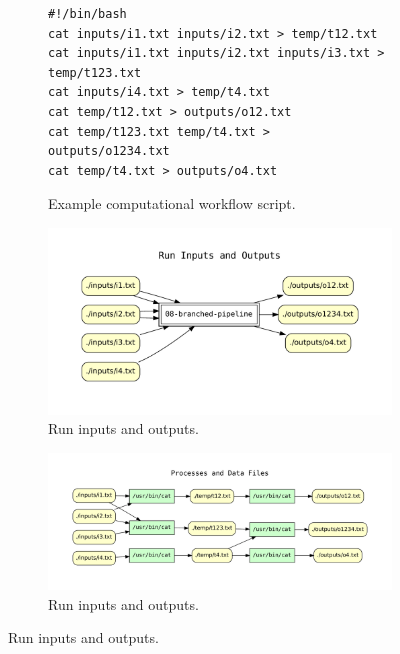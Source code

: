 \begin{figure}[h!]
    \centering
    
    \begin{subfigure}[b]{1.0\linewidth}
        \centering
        \begin{lstlisting}
#!/bin/bash
cat inputs/i1.txt inputs/i2.txt > temp/t12.txt
cat inputs/i1.txt inputs/i2.txt inputs/i3.txt > temp/t123.txt
cat inputs/i4.txt > temp/t4.txt
cat temp/t12.txt > outputs/o12.txt
cat temp/t123.txt temp/t4.txt > outputs/o1234.txt
cat temp/t4.txt > outputs/o4.txt
        \end{lstlisting}
        \setlength{\abovecaptionskip}{-2pt}
        \setlength{\belowcaptionskip}{15pt}
        \caption{Example computational workflow script.}
    \end{subfigure}



    \begin{subfigure}[b]{\linewidth}
        \centering
        \includegraphics[width=0.69\linewidth]{cpr_run_inputs_outputs.pdf}
        \setlength{\abovecaptionskip}{-10pt}
        \setlength{\belowcaptionskip}{15pt}
        \caption{Run inputs and outputs.}
    \end{subfigure}

    \begin{subfigure}[b]{1.0\linewidth}
        \centering
        \includegraphics[width=\linewidth]{cpr_processes_and_data_files.pdf}
        \setlength{\abovecaptionskip}{-5pt}
        \caption{Run inputs and outputs.}
    \end{subfigure}
    
    \label{fig:cpr-example}
\end{figure}



